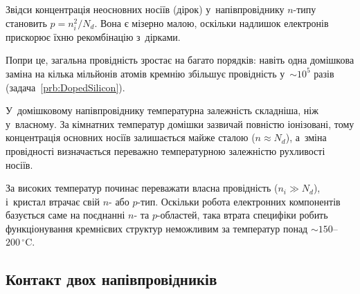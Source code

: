 Звідси концентрація неосновних носіїв (дірок) у~напівпровіднику $n$-типу становить $p =
n_i^2 / N_d$. Вона є мізерно малою, оскільки надлишок електронів прискорює їхню
рекомбінацію з~дірками.

Попри це, загальна провідність зростає на багато порядків: навіть одна домішкова заміна на
кілька мільйонів атомів кремнію збільшує провідність у~$\sim10^5$ разів
(задача~\ref{prb:DopedSilicon}).



У~домішковому напівпровіднику температурна залежність складніша, ніж у~власному. За
кімнатних температур домішки зазвичай повністю іонізовані, тому концентрація основних
носіїв залишається майже сталою ($n \approx N_d$), а~зміна провідності визначається
переважно температурною залежністю рухливості носіїв.

За високих температур починає переважати власна провідність ($n_i \gg N_d$), і~кристал
втрачає свій $n$- або $p$-тип. Оскільки робота електронних компонентів базується саме на
поєднанні $n$- та $p$-областей, така втрата специфіки робить функціонування кремнієвих
структур неможливим за температур понад $\sim150$--$200\,^\circ\text{C}$.


\subsection*{Контакт двох напівпровідників}


